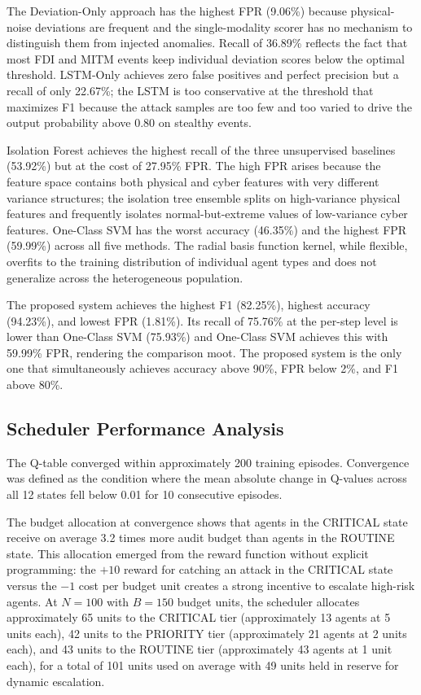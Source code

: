 The Deviation-Only approach has the highest FPR (9.06\%) because physical-noise deviations are
frequent and the single-modality scorer has no mechanism to distinguish them from injected
anomalies. Recall of 36.89\% reflects the fact that most FDI and MITM events keep individual
deviation scores below the optimal threshold. LSTM-Only achieves zero false positives and perfect
precision but a recall of only 22.67\%; the LSTM is too conservative at the threshold that
maximizes F1 because the attack samples are too few and too varied to drive the output probability
above 0.80 on stealthy events.

Isolation Forest achieves the highest recall of the three unsupervised baselines (53.92\%) but at
the cost of 27.95\% FPR. The high FPR arises because the feature space contains both physical and
cyber features with very different variance structures; the isolation tree ensemble splits on
high-variance physical features and frequently isolates normal-but-extreme values of low-variance
cyber features. One-Class SVM has the worst accuracy (46.35\%) and the highest FPR (59.99\%) across
all five methods. The radial basis function kernel, while flexible, overfits to the training
distribution of individual agent types and does not generalize across the heterogeneous population.

The proposed system achieves the highest F1 (82.25\%), highest accuracy (94.23\%), and lowest FPR
(1.81\%). Its recall of 75.76\% at the per-step level is lower than One-Class SVM (75.93\%) and
One-Class SVM achieves this with 59.99\% FPR, rendering the comparison moot. The proposed system
is the only one that simultaneously achieves accuracy above 90\%, FPR below 2\%, and F1 above 80\%.

\subsection{Scheduler Performance Analysis}
\label{sec:scheduler_perf}

The Q-table converged within approximately 200 training episodes. Convergence was defined as the
condition where the mean absolute change in Q-values across all 12 states fell below 0.01 for 10
consecutive episodes.

The budget allocation at convergence shows that agents in the CRITICAL state receive on average 3.2
times more audit budget than agents in the ROUTINE state. This allocation emerged from the reward
function without explicit programming: the $+10$ reward for catching an attack in the CRITICAL
state versus the $-1$ cost per budget unit creates a strong incentive to escalate high-risk agents.
At $N = 100$ with $B = 150$ budget units, the scheduler allocates approximately 65 units to the
CRITICAL tier (approximately 13 agents at 5 units each), 42 units to the PRIORITY tier
(approximately 21 agents at 2 units each), and 43 units to the ROUTINE tier (approximately 43
agents at 1 unit each), for a total of 101 units used on average with 49 units held in reserve
for dynamic escalation.

